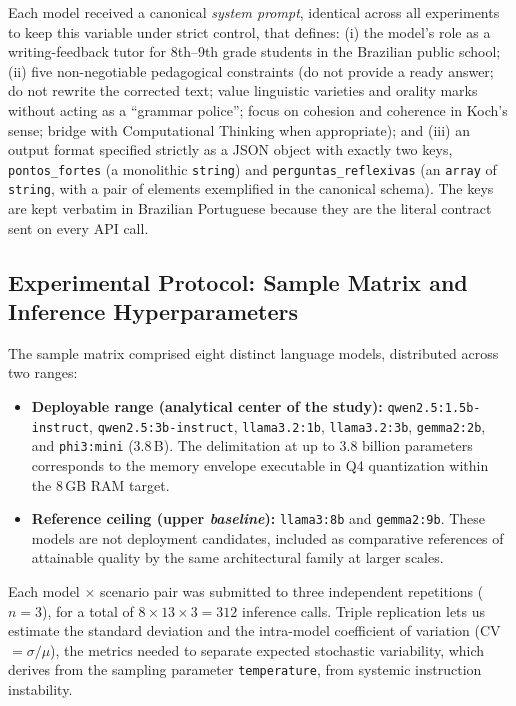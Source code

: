 \documentclass{sbc2023}%
\begin{document}
Each model received a canonical \textit{system prompt}, identical across all experiments to keep this variable under strict control, that defines: (i) the model's role as a writing-feedback tutor for 8th--9th grade students in the Brazilian public school; (ii) five non-negotiable pedagogical constraints (do not provide a ready answer; do not rewrite the corrected text; value linguistic varieties and orality marks without acting as a ``grammar police''; focus on cohesion and coherence in Koch's sense; bridge with Computational Thinking when appropriate); and (iii) an output format specified strictly as a JSON object with exactly two keys, \texttt{pontos\_fortes} (a monolithic \texttt{string}) and \texttt{perguntas\_reflexivas} (an \texttt{array} of \texttt{string}, with a pair of elements exemplified in the canonical schema). The keys are kept verbatim in Brazilian Portuguese because they are the literal contract sent on every API call.

\subsection{Experimental Protocol: Sample Matrix and Inference Hyperparameters}
\label{sec:protocol}

The sample matrix comprised eight distinct language models, distributed across two ranges:

\begin{itemize}
\item \textbf{Deployable range (analytical center of the study):} \texttt{qwen2.5:1.5b-instruct}, \texttt{qwen2.5:3b-instruct}, \texttt{llama3.2:1b}, \texttt{llama3.2:3b}, \texttt{gemma2:2b}, and \texttt{phi3:mini} (3.8\,B). The delimitation at up to 3.8 billion parameters corresponds to the memory envelope executable in Q4 quantization within the 8\,GB RAM target.
\item \textbf{Reference ceiling (upper \textit{baseline}):} \texttt{llama3:8b} and \texttt{gemma2:9b}. These models are not deployment candidates, included as comparative references of attainable quality by the same architectural family at larger scales.
\end{itemize}

Each model $\times$ scenario pair was submitted to three independent repetitions ($n=3$), for a total of $8 \times 13 \times 3 = 312$ inference calls. Triple replication lets us estimate the standard deviation and the intra-model coefficient of variation (CV $=\sigma/\mu$), the metrics needed to separate expected stochastic variability, which derives from the sampling parameter \texttt{temperature}, from systemic instruction instability.
\end{document}
